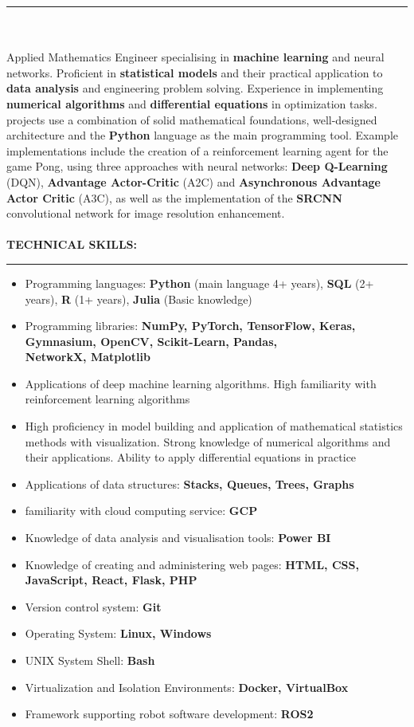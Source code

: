 \documentclass[10pt]{article}
\newcommand{\longline}{\rule{19.6cm}{1pt}}
\begin{document}
\noindent \longline 
\\ \\
\noindent Applied Mathematics Engineer specialising in \textbf{machine learning} and neural networks.
Proficient in \textbf{statistical models} and their practical application to \textbf{data analysis} and engineering problem solving.
Experience in implementing \textbf{numerical algorithms} and \textbf{differential equations} in optimization tasks. 
projects use a combination of solid mathematical foundations, well-designed architecture and the \textbf{Python} language as the main programming tool. 
Example implementations include the creation of a reinforcement learning agent for the game Pong, 
using three approaches with neural networks: \textbf{Deep Q-Learning} (DQN), \textbf{Advantage Actor-Critic} (A2C) and \textbf{Asynchronous Advantage Actor Critic} (A3C), 
as well as the implementation of the \textbf{SRCNN} convolutional network for image resolution enhancement.
\\ \\
\noindent \fontsize{14pt}{14pt}\selectfont \textbf{\color{Violet}TECHNICAL SKILLS:}
\fontsize{10pt}{10pt}\selectfont 
\\ 
\noindent \longline 
\begin{itemize}[leftmargin=*, parsep=0.5pt]
    \item Programming languages: \textbf{Python} (main language 4+ years), \textbf{SQL} (2+ years), \textbf{R} (1+ years), \textbf{Julia} (Basic knowledge)
    \item Programming libraries: \textbf{NumPy, PyTorch, TensorFlow, Keras, Gymnasium, OpenCV, Scikit-Learn, Pandas, \\ NetworkX, Matplotlib}
    \item Applications of deep machine learning algorithms. High familiarity with reinforcement learning algorithms
    \item High proficiency in model building and application of mathematical statistics methods with visualization. Strong knowledge of
    numerical algorithms and their applications. Ability to apply differential equations in practice
    \item Applications of data structures: \textbf{Stacks, Queues, Trees, Graphs}
    \item familiarity with cloud computing service: \textbf{GCP}
    \item Knowledge of data analysis and visualisation tools: \textbf{Power BI}
    \item Knowledge of creating and administering web pages: \textbf{HTML, CSS, JavaScript, React, Flask, PHP}
    \item Version control system: \textbf{Git}
    \item Operating System: \textbf{Linux, Windows}
    \item UNIX System Shell: \textbf{Bash} 
    \item Virtualization and Isolation Environments: \textbf{Docker, VirtualBox}
    \item Framework supporting robot software development: \textbf{ROS2}
\end{itemize}
\end{document}
